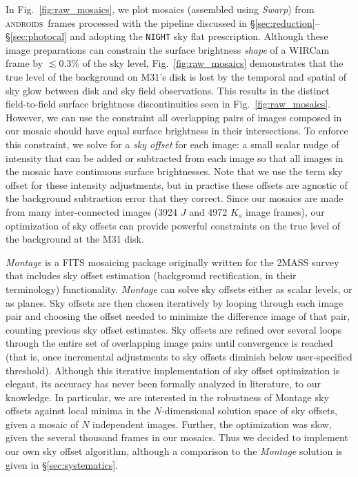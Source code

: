 \documentclass[iop]{emulateapj}
\newcommand{\sw}[1]{\textit{#1}} %
\newcommand{\androids}{\textsc{androids}}
\newcommand{\Fig}[1]{Fig.~\ref{fig:#1}}  %
\newcommand{\Sec}[1]{\S\ref{sec:#1}}  %
\begin{document}
In \Fig{raw_mosaics}, we plot mosaics (assembled using \sw{Swarp}) from \androids\ frames processed with the pipeline discussed in \Sec{reduction}--\Sec{photocal} and adopting the \texttt{NIGHT} sky flat prescription.
Although these image preparations can constrain the surface brightness \emph{shape} of a WIRCam frame by $\lesssim 0.3\%$ of the sky level, \Fig{raw_mosaics} demonstrates that the true level of the background on M31's disk is lost by the temporal and spatial of sky glow between disk and sky field observations.
This results in the distinct field-to-field surface brightness discontinuities seen in \Fig{raw_mosaics}.
However, we can use the constraint all overlapping pairs of images composed in our mosaic should have equal surface brightness in their intersections.
To enforce this constraint, we solve for a \emph{sky offset} for each image: a small scalar nudge of intensity that can be added or subtracted from each image so that all images in the mosaic have continuous surface brightnesses.
Note that we use the term sky offset for these intensity adjustments, but in practise these offsets are agnostic of the background subtraction error that they correct.
Since our mosaics are made from many inter-connected images (3924 $J$ and 4972 $K_s$ image frames), our optimization of sky offsets can provide powerful constraints on the true level of the background at the M31 disk.

\sw{Montage} is a FITS mosaicing package \citep{Berriman:2008} originally written for the 2MASS survey that includes sky offset estimation (background rectification, in their terminology) functionality.
\sw{Montage} can solve sky offsets either as scalar levels, or as planes.
Sky offsets are then chosen iteratively by looping through each image pair and choosing the offset needed to minimize the difference image of that pair, counting previous sky offset estimates.
Sky offsets are refined over several loops through the entire set of overlapping image pairs until convergence is reached (that is, once incremental adjustments to sky offsets diminish below user-specified threshold).
Although this iterative implementation of sky offset optimization is elegant, its accuracy has never been formally analyzed in literature, to our knowledge.
In particular, we are interested in the robustness of Montage sky offsets against local minima in the $N$-dimensional solution space of sky offsets, given a mosaic of $N$ independent images.
Further, the optimization was slow, given the several thousand frames in our mosaics.
Thus we decided to implement our own sky offset algorithm, although a comparison to the \sw{Montage} solution is given in \Sec{systematics}.
\end{document}
